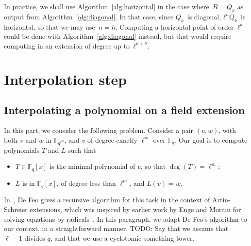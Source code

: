 \documentclass{lms}
\newcommand{\todo}[1]{{\color{red}TODO: #1}}
\newcommand{\F}{\mathbb{F}}
\begin{document}
In practice, we shall use Algorithm~\ref{alg:horizontal}
in the case where~$R = Q_{k}$ as output from Algorithm~\ref{alg:diagonal}.
In that case, since $Q_k$~is diagonal, $ℓ^{h} Q_k$~is horizontal,
so that we may use~$n=h$.
Computing a horizontal point of order~$ℓ^k$ could be done
with Algorithm~\ref{alg:diagonal} instead,
but that would require computing in an extension
of degree up to~$ℓ^{k+h}$.




\section{Interpolation step}
\label{sec:interpolation}
\subsection{Interpolating a polynomial on a field extension}

In this part, we consider the following problem. Consider a pair $(v,
w)$, with both $v$ and $w$ in $\F_{q^{\ell^m}}$, and $v$ of degree exactly
$\ell^m$ over $\F_q$. Our goal is to
compute polynomials $T$ and $L$ such that
\begin{itemize}
\item $T \in \F_q[x]$ is the minimal polynomial of $v$, so that $\deg(T) = \ell^m$;
\item $L$ is in $\F_q[x]$, of degree less than $\ell^m$, and $L(v)=w$.
\end{itemize}
In~\cite{df10}, De Feo gives a recursive algorithm for this task in the
context of Artin-Schreier extensions, which was inspired by earlier
work by Enge and Morain for solving equations by radicals~\cite{enge+morain03}.
In this paragraph, we adapt De Feo's algorithm to our context, in a straightforward manner. 
\todo{Say that we assume that $\ell-1$ divides $q$, and that we
use a cyclotomic-something tower.}
\end{document}
